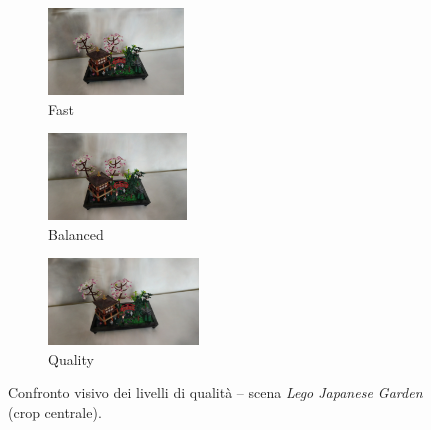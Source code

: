 \begin{figure}[H]
	\centering
	\begin{subfigure}{0.32\textwidth}
		\includegraphics[width=\linewidth, height=2.3cm, trim={80 40 80 40}, clip]{images/benchmarks/lego_japanese_garden_taming_fast.jpg}
		\caption{Fast}
	\end{subfigure}
	\hfill
	\begin{subfigure}{0.32\textwidth}
		\includegraphics[width=\linewidth, height=2.3cm, trim={80 40 80 40}, clip]{images/benchmarks/lego_japanese_garden_taming_balanced.jpg}
		\caption{Balanced}
	\end{subfigure}
	\hfill
	\begin{subfigure}{0.32\textwidth}
		\includegraphics[width=\linewidth, height=2.3cm, trim={80 40 80 40}, clip]{images/benchmarks/lego_japanese_garden_taming_quality.jpg}
		\caption{Quality}
	\end{subfigure}
	\caption{Confronto visivo dei livelli di qualit\`a -- scena \textit{Lego Japanese Garden} (crop centrale).}
	\label{fig:lego_japanese_garden_quality_comparison}
\end{figure}

